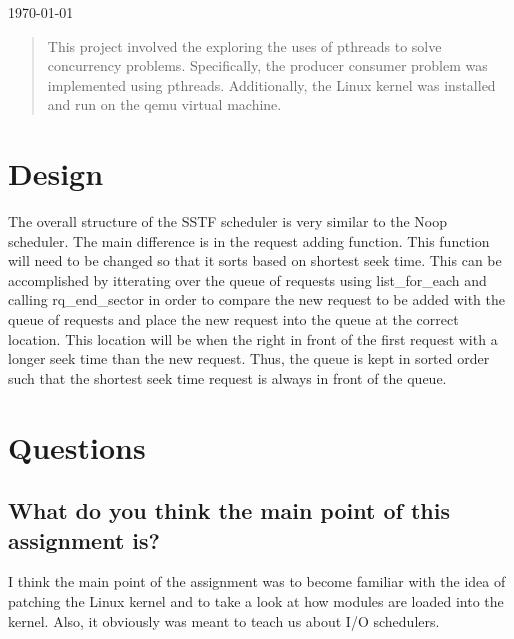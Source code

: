 \documentclass[journal,letterpaper,draftclsnofoot,onecolumn,10pt]{IEEEtran}
\begin{document}
\begin{titlepage}

{\large \today}\\[3cm] %

\begin{abstract}
This project involved the exploring the uses of pthreads to solve concurrency problems. Specifically, the producer consumer problem was implemented using pthreads. Additionally, the Linux kernel was installed and run on the qemu virtual machine.
\end{abstract}

\vfill %

\pagebreak

\end{titlepage}

\section{Design}
The overall structure of the SSTF scheduler is very similar to the Noop scheduler. The main difference is in the request adding function. This function will need to be changed so that it sorts based on shortest seek time. This can be accomplished by itterating over the queue of requests using list\_for\_each and calling rq\_end\_sector in order to compare the new request to be added with the queue of requests and place the new request into the queue at the correct location. This location will be when the right in front of the first request with a longer seek time than the new request. Thus, the queue is kept in sorted order such that the shortest seek time request is always in front of the queue.
\section{Questions}
\subsection{What do you think the main point of this assignment is?}
I think the main point of the assignment was to become familiar with the idea of patching the Linux kernel and to take a look at how modules are loaded into the kernel. Also, it obviously was meant to teach us about I/O schedulers.
\end{document}
